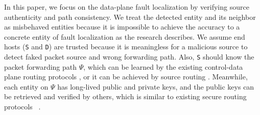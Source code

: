In this paper, we focus on the data-plane fault localization by verifying source authenticity and path consistency. We treat the detected entity and its neighbor as misbehaved entities because it is impossible to achieve the accuracy to a concrete entity of fault localization as the research \cite{barak2008protocols} describes. 
We assume end hosts ({\tt S} and {\tt D}) are trusted because it is meaningless for a malicious source to detect faked packet source and wrong forwarding path. %
Also, {\tt S} should know the packet forwarding path $\Psi$, which can be learned by the existing control-data plane routing protocols \cite{hu2004spv} \cite{murphy1996digital}, or it can be achieved by source routing \cite{sourcerouting}. %
Meanwhile, each entity on $\Psi$ has long-lived public and private keys, and the public keys can be retrieved and verified by others, which is similar to existing secure routing protocols~\cite{kim2014lightweight} \cite{basescu2016high} \cite{zhang2012shortmac} . 
